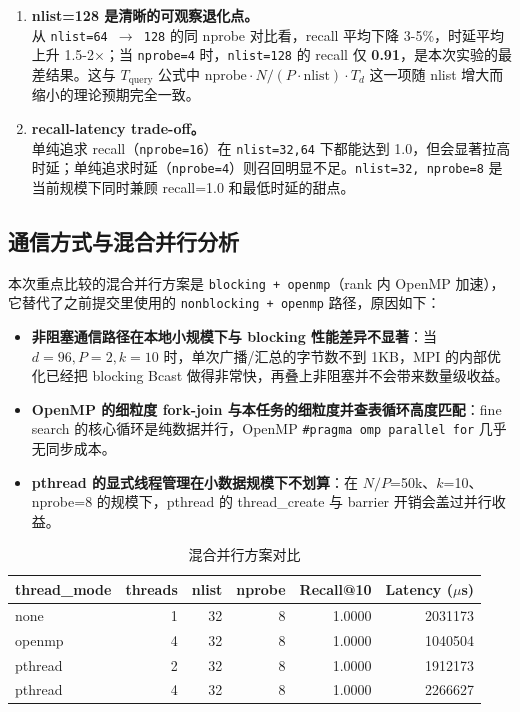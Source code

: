 \documentclass[a4paper]{article}
\begin{document}
\begin{enumerate}
    \item \textbf{nlist=128 是清晰的可观察退化点。}\\
    从 \texttt{nlist=64 $\rightarrow$ 128} 的同 nprobe 对比看，recall 平均下降 3-5\%，时延平均上升 1.5-2$\times$；当 \texttt{nprobe=4} 时，\texttt{nlist=128} 的 recall 仅 \textbf{0.91}，是本次实验的最差结果。这与 $T_{\text{query}}$ 公式中 $\text{nprobe} \cdot N/(P \cdot \text{nlist}) \cdot T_d$ 这一项随 nlist 增大而缩小的理论预期完全一致。

    \item \textbf{recall-latency trade-off。}\\
    单纯追求 recall（\texttt{nprobe=16}）在 \texttt{nlist=32,64} 下都能达到 1.0，但会显著拉高时延；单纯追求时延（\texttt{nprobe=4}）则召回明显不足。\texttt{nlist=32, nprobe=8} 是当前规模下同时兼顾 recall=1.0 和最低时延的甜点。
\end{enumerate}

\subsection{通信方式与混合并行分析}

本次重点比较的混合并行方案是 \texttt{blocking + openmp}（rank 内 OpenMP 加速），它替代了之前提交里使用的 \texttt{nonblocking + openmp} 路径，原因如下：

\begin{itemize}
    \item \textbf{非阻塞通信路径在本地小规模下与 blocking 性能差异不显著}：当 $d=96, P=2, k=10$ 时，单次广播/汇总的字节数不到 1KB，MPI 的内部优化已经把 blocking Bcast 做得非常快，再叠上非阻塞并不会带来数量级收益。
    \item \textbf{OpenMP 的细粒度 fork-join 与本任务的细粒度并查表循环高度匹配}：fine search 的核心循环是纯数据并行，OpenMP \texttt{\#pragma omp parallel for} 几乎无同步成本。
    \item \textbf{pthread 的显式线程管理在小数据规模下不划算}：在 $N/P$=50k、$k$=10、nprobe=8 的规模下，pthread 的 thread\_create 与 barrier 开销会盖过并行收益。
\end{itemize}

\begin{table}[H]
\centering
\small
\begin{tabular}{lrrrrr}
\toprule
thread\_mode & threads & nlist & nprobe & Recall@10 & Latency ($\mu$s) \\
\midrule
none & 1 & 32 & 8 & 1.0000 & 2031173 \\
openmp & 4 & 32 & 8 & 1.0000 & 1040504 \\
pthread & 2 & 32 & 8 & 1.0000 & 1912173 \\
pthread & 4 & 32 & 8 & 1.0000 & 2266627 \\
\bottomrule
\end{tabular}
\caption{混合并行方案对比}
\end{table}
\end{document}
